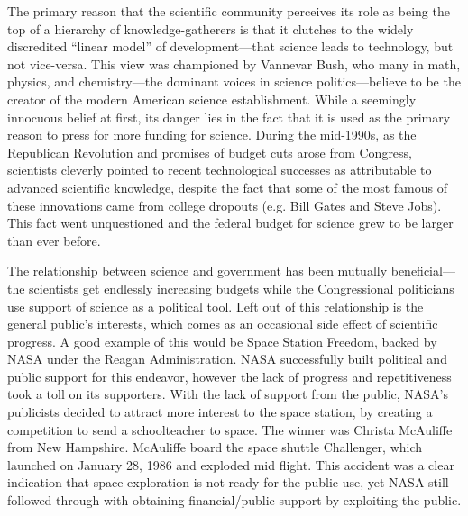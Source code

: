 \documentclass{article}[12pt]
\begin{document}
The primary reason that the scientific community perceives its role as being
the top of a hierarchy of knowledge-gatherers is that it clutches to the widely
discredited ``linear model'' of development---that science leads to technology,
but not vice-versa. This view was championed by Vannevar Bush,
who many in math, physics, and chemistry---the dominant voices in science
politics---believe to be the creator of the modern American science
establishment. While a seemingly innocuous belief at first, its danger lies in
the fact that it is used as the primary reason to press for more funding for
science. During the mid-1990s, as the Republican Revolution and promises of
budget cuts arose from Congress, scientists cleverly pointed to recent
technological successes as attributable to advanced scientific knowledge,
despite the fact that some of the most famous of these innovations came from
college dropouts (e.g. Bill Gates and Steve Jobs). This fact went
unquestioned and the federal budget for science grew to be larger than ever
before.

The relationship between science and government has been mutually
beneficial---the scientists get endlessly increasing budgets while the
Congressional politicians use support of science as a political tool. Left out
of this relationship is the general public's interests, which comes as an
occasional side effect of scientific progress. A good example of this would be
Space Station Freedom, backed by NASA under the Reagan Administration.  NASA
successfully built political and public support for this endeavor, however the
lack of progress and repetitiveness took a toll on its supporters.  With the
lack of support from the public, NASA's publicists decided to attract more
interest to the space station, by creating a competition to send a
schoolteacher to space.  The winner was Christa McAuliffe from New Hampshire.
McAuliffe board the space shuttle Challenger, which launched on January 28,
1986 and exploded mid flight.  This accident was a clear indication that space
exploration is not ready for the public use, yet NASA still followed through
with obtaining financial/public support by exploiting the
public.
\end{document}
